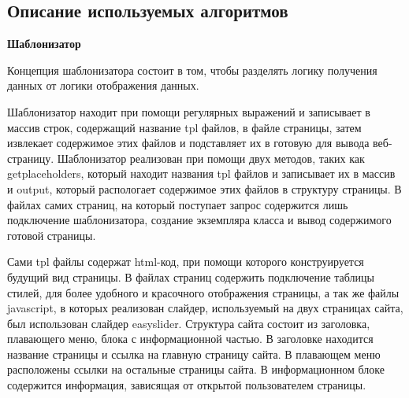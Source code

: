 \subsection{\normalsize Описание используемых алгоритмов}
\label{sec:exp:pc}
\begin{center}
\textbf{Шаблонизатор} 
\end{center}
Концепция шаблонизатора состоит в том, чтобы разделять логику получения данных от логики отображения данных.

Шаблонизатор находит при помощи регулярных выражений и  записывает в массив строк, содержащий название tpl файлов, в файле страницы, затем извлекает содержимое этих файлов и подставляет их в готовую для вывода веб-страницу.
	Шаблонизатор реализован при помощи двух методов, таких как  getplaceholders, который находит названия tpl файлов и записывает их в массив и output, который распологает содержимое этих файлов в структуру страницы.
В файлах самих страниц, на который поступает запрос содержится лишь подключение шаблонизатора, создание экземпляра класса и вывод содержимого готовой страницы.	

Сами tpl файлы содержат html-код, при помощи которого конструируется будущий вид страницы.
В файлах страниц содержить подключение таблицы стилей, для более удобного и красочного отображения страницы, а так же файлы javascript, в которых реализован слайдер, используемый на двух страницах сайта, был использован слайдер easyslider.
Структура сайта состоит из заголовка, плавающего меню, блока с информационной частью.
В заголовке находится название страницы и ссылка на главную страницу сайта.
В плавающем меню расположены ссылки на остальные страницы сайта.
В информационном блоке содержится информация, зависящая от открытой пользователем страницы.